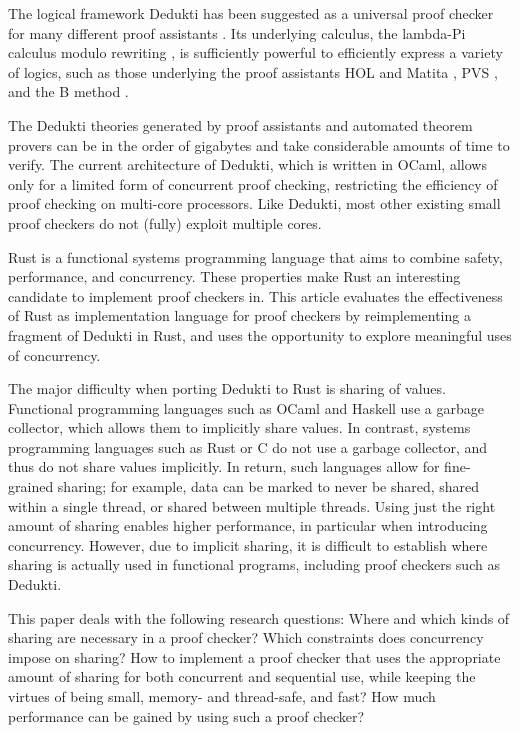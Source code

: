 \documentclass[screen,sigplan,10pt]{acmart}
\begin{document}
The logical framework Dedukti has been suggested as a universal proof
checker for many different proof assistants \citep{expressing}. Its
underlying calculus, the lambda-Pi calculus modulo rewriting
\citep{DBLP:conf/tlca/CousineauD07}, is sufficiently powerful to
efficiently express a variety of logics, such as those underlying the
proof assistants HOL and Matita \citep{DBLP:phd/hal/Assaf15}, PVS
\citep{DBLP:phd/hal/Gilbert18}, and the B method
\citep{DBLP:phd/hal/Halmagrand16}.

The Dedukti theories generated by proof assistants and automated theorem
provers can be in the order of gigabytes and take considerable amounts
of time to verify. The current architecture of Dedukti, which is written
in OCaml, allows only for a limited form of concurrent proof checking,
restricting the efficiency of proof checking on multi-core processors.
Like Dedukti, most other existing small proof checkers do not (fully)
exploit multiple cores.

Rust is a functional systems programming language that aims to combine
safety, performance, and concurrency. These properties make Rust an
interesting candidate to implement proof checkers in. This article
evaluates the effectiveness of Rust as implementation language for proof
checkers by reimplementing a fragment of Dedukti in Rust, and uses the
opportunity to explore meaningful uses of concurrency.

The major difficulty when porting Dedukti to Rust is sharing of values.
Functional programming languages such as OCaml and Haskell use a garbage
collector, which allows them to implicitly share values. In contrast,
systems programming languages such as Rust or C do not use a garbage
collector, and thus do not share values implicitly. In return, such
languages allow for fine-grained sharing; for example, data can be
marked to never be shared, shared within a single thread, or shared
between multiple threads. Using just the right amount of sharing enables
higher performance, in particular when introducing concurrency. However,
due to implicit sharing, it is difficult to establish where sharing is
actually used in functional programs, including proof checkers such as
Dedukti.

This paper deals with the following research questions: Where and which
kinds of sharing are necessary in a proof checker? Which constraints
does concurrency impose on sharing? How to implement a proof checker
that uses the appropriate amount of sharing for both concurrent and
sequential use, while keeping the virtues of being small, memory- and
thread-safe, and fast? How much performance can be gained by using such
a proof checker?
\end{document}
